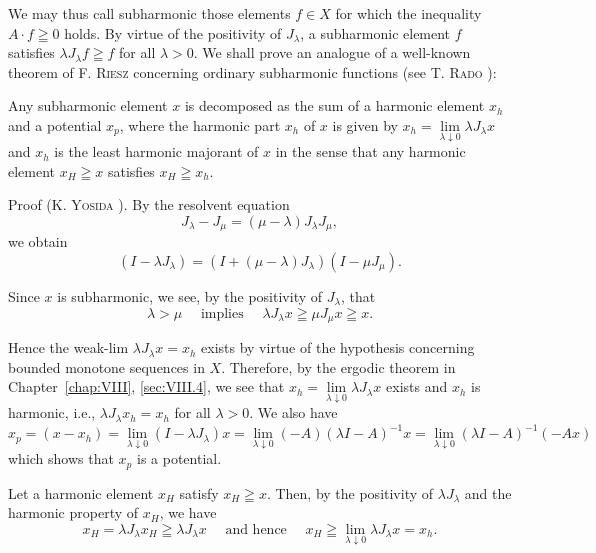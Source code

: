 We may thus call subharmonic those elements $f \in X$ for which the inequality $A \cdot f \geqq 0$ holds. By virtue of the positivity of $J_{\lambda}$, a subharmonic element $f$ satisfies $\lambda J_{\lambda} f \geqq f$ for all $\lambda > 0$. We shall prove an analogue of a well-known theorem of F. \textsc{Riesz} concerning ordinary subharmonic functions (see T. \textsc{Rado} \cite{rado266}): 

\begin{theoremu} Any subharmonic element $x$ is decomposed as the sum of a harmonic element $x_{h}$ and a potential $x_{p}$, where the harmonic part $x_{h}$ of $x$ is given by $x_{h} = \lim\limits_{\lambda \downarrow 0} \lambda J_{\lambda} x$ and $x_{h}$ is the least harmonic majorant of $x$ in the sense that any harmonic element $x_{H} \geqq x$ satisfies $x_{H} \geqq x_{h}$. 
\end{theoremu}

Proof (K. \textsc{Yosida} \cite{yosida347}). By the resolvent equation 
\begin{equation}\label{eq:XIII.8.1}
J _{\lambda} - J _{\mu} = (\mu - \lambda) J _{\lambda} J _{\mu},
\end{equation}
we obtain 
\begin{equation}\label{eq:XIII.8.2}
(I - \lambda J _{\lambda}) = (I + (\mu - \lambda) J _{\lambda}) (I - \mu J _{\mu}).
\end{equation}

Since $x$ is subharmonic, we see, by the positivity of $J_{\lambda}$, that 
\[
\lambda > \mu \quad \text{ implies } \quad \lambda J _{\lambda} x \geqq \mu J _{\mu} x \geqq x.
\]

Hence the weak-lim $\lambda J_{\lambda}x = x_{h}$ exists by virtue of the hypothesis concerning bounded monotone sequences in $X$. Therefore, by the ergodic theorem in Chapter~\ref{chap:VIII}, \ref{sec:VIII.4}, we see that $x_{h} = \lim\limits_{\lambda \downarrow 0} \lambda J_{\lambda}x$ exists and $x_{h}$ is harmonic, i.e., $\lambda J_{\lambda}x_{h} = x_{h}$ for all $\lambda > 0$. We also have $x_{p} = (x - x_{h}) = \lim\limits_{\lambda \downarrow 0} (I - \lambda J_{\lambda})x = \lim\limits_{\lambda \downarrow 0} (-A)(\lambda I - A)^{-1}x = \lim\limits_{\lambda \downarrow 0} (\lambda I - A)^{-1}(-Ax)$ which shows that $x_{p}$ is a potential. 

Let a harmonic element $x_{H}$ satisfy $x_{H} \geqq x$. Then, by the positivity of $\lambda J_{\lambda}$ and the harmonic property of $x_{H}$, we have 
\[
x _{H} = \lambda J _{\lambda} x _{H} \geqq \lambda J _{\lambda} x \quad \text{ and hence } \quad x _{H} \geqq \lim\limits _{\lambda \downarrow 0} \lambda J _{\lambda} x = x _{h}.
\]


